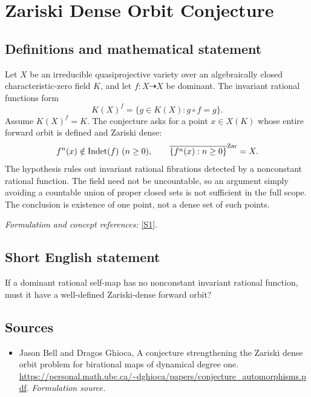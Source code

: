 \documentclass[11pt]{article}
\begin{document}
\section*{\texorpdfstring{Zariski Dense Orbit Conjecture}{Zariski Dense Orbit Conjecture}}\label{30006963}
\subsection{Definitions and mathematical statement}
Let $X$ be an irreducible quasiprojective variety over an algebraically closed characteristic-zero field $K$, and let $f:X\dashrightarrow X$ be dominant. The invariant rational functions form
\[
 K(X)^f=\{g\in K(X):g\circ f=g\}.
\]
Assume $K(X)^f=K$. The conjecture asks for a point $x\in X(K)$ whose entire forward orbit is defined and Zariski dense:
\[
 f^n(x)\notin\operatorname{Indet}(f)\ (n\ge0),
 \qquad\overline{\{f^n(x):n\ge0\}}^{\rm Zar}=X.
\]
The hypothesis rules out invariant rational fibrations detected by a nonconstant rational function. The field need not be uncountable, so an argument simply avoiding a countable union of proper closed sets is not sufficient in the full scope. The conclusion is existence of one point, not a dense set of such points.
\par\smallskip\textit{Formulation and concept references:} \href{https://personal.math.ubc.ca/~dghioca/papers/conjecture_automorphisms.pdf}{[S1]}.

\subsection{Short English statement}
If a dominant rational self-map has no nonconstant invariant rational function, must it have a well-defined Zariski-dense forward orbit?
\subsection{Sources}
\begin{itemize}
\item[S1]Jason Bell and Dragos Ghioca, A conjecture strengthening the Zariski dense orbit problem for birational maps of dynamical degree one.
\url{https://personal.math.ubc.ca/~dghioca/papers/conjecture_automorphisms.pdf}.
\textit{Formulation source.}
\end{itemize}
\end{document}
